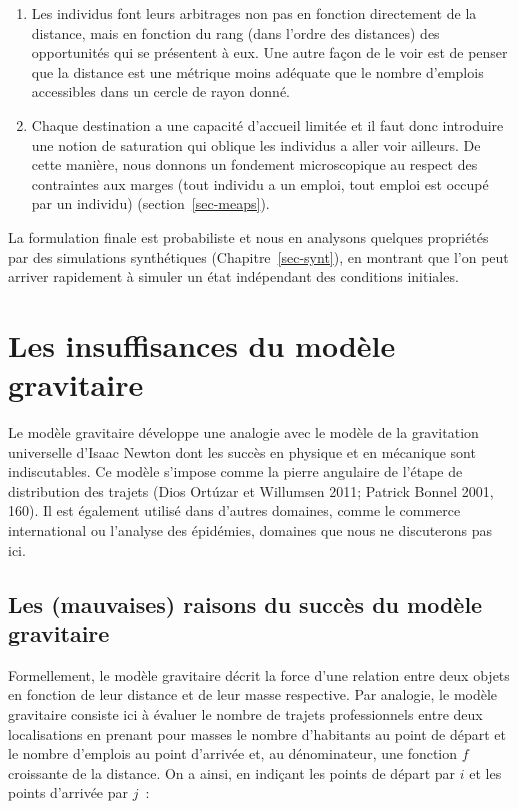 \documentclass[
  10pt,
  a4paper,
  numbers=noendperiod,
  DIV=9]{scrartcl}
\begin{document}
\begin{enumerate}
\def\labelenumi{\arabic{enumi}.}
\item
  Les individus font leurs arbitrages non pas en fonction directement de
  la distance, mais en fonction du rang (dans l'ordre des distances) des
  opportunités qui se présentent à eux. Une autre façon de le voir est
  de penser que la distance est une métrique moins adéquate que le
  nombre d'emplois accessibles dans un cercle de rayon donné.
\item
  Chaque destination a une capacité d'accueil limitée et il faut donc
  introduire une notion de saturation qui oblique les individus a aller
  voir ailleurs. De cette manière, nous donnons un fondement
  microscopique au respect des contraintes aux marges (tout individu a
  un emploi, tout emploi est occupé par un individu)
  (section~\ref{sec-meaps}).
\end{enumerate}

La formulation finale est probabiliste et nous en analysons quelques
propriétés par des simulations synthétiques (Chapitre~\ref{sec-synt}),
en montrant que l'on peut arriver rapidement à simuler un état
indépendant des conditions initiales.

\hypertarget{sec-grav}{%
\section{Les insuffisances du modèle gravitaire}\label{sec-grav}}

Le modèle gravitaire développe une analogie avec le modèle de la
gravitation universelle d'Isaac Newton dont les succès en physique et en
mécanique sont indiscutables. Ce modèle s'impose comme la pierre
angulaire de l'étape de distribution des trajets (Dios Ortúzar et
Willumsen 2011; Patrick Bonnel 2001, 160). Il est également utilisé dans
d'autres domaines, comme le commerce international ou l'analyse des
épidémies, domaines que nous ne discuterons pas ici.

\hypertarget{les-mauvaises-raisons-du-succuxe8s-du-moduxe8le-gravitaire}{%
\subsection{Les (mauvaises) raisons du succès du modèle
gravitaire}\label{les-mauvaises-raisons-du-succuxe8s-du-moduxe8le-gravitaire}}

Formellement, le modèle gravitaire décrit la force d'une relation entre
deux objets en fonction de leur distance et de leur masse respective.
Par analogie, le modèle gravitaire consiste ici à évaluer le nombre de
trajets professionnels entre deux localisations en prenant pour masses
le nombre d'habitants au point de départ et le nombre d'emplois au point
d'arrivée et, au dénominateur, une fonction \(f\) croissante de la
distance. On a ainsi, en indiçant les points de départ par \(i\) et les
points d'arrivée par \(j\)~:
\end{document}
